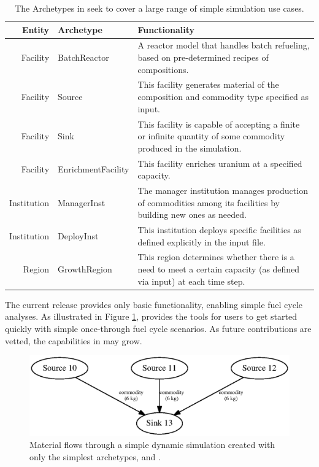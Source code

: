 \begin{table}[h]
\centering
\begin{tabularx}{\textwidth}{|r|l|X|}
\hline
\textbf{Entity} & \textbf{Archetype} & \textbf{Functionality} \\
\hline
Facility & BatchReactor & A reactor model that handles batch refueling, based on pre-determined recipes of compositions. \\
Facility & Source & This facility generates material of the composition and commodity type specified as input.  \\
Facility & Sink & This facility is capable of accepting a finite or infinite quantity of some commodity produced in the simulation. \\
Facility & EnrichmentFacility & This facility enriches uranium at a specified capacity. \\
Institution & ManagerInst & The manager institution manages production of commodities among its facilities by building new ones as needed. \\
Institution & DeployInst &  This institution deploys specific facilities as defined explicitly in the input file. \\
Region & GrowthRegion & This region determines whether there is a need to meet a certain capacity (as defined via input) at each time step. \\
\hline
\end{tabularx}
\caption{The Archetypes in \Cycamore seek to cover a large range of simple simulation use cases.}
\label{tab:cycamore}
\end{table}

The current \Cycamore release provides only 
basic functionality, enabling simple fuel cycle analyses. 
As illustrated in Figure \ref{fig:simplesim}, \Cycamore provides the tools for users
to get started quickly with simple 
once-through fuel cycle scenarios. As future contributions are vetted, the capabilities in \Cycamore may grow.

\begin{figure}[htbp!]
\begin{center}
\includegraphics{./images/simplesim}
\end{center}
\caption{Material flows through a simple dynamic simulation created with only the simplest \Cycamore archetypes,  and .}
\label{fig:simplesim}
\end{figure}

